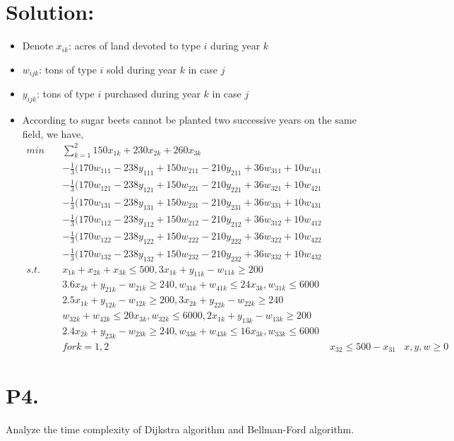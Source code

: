 \documentclass{article}
\theoremstyle{definition}
\theoremstyle{definition}
\theoremstyle{remark}
\begin{document}
\section*{Solution:}
\begin{itemize}
\item Denote $x_{ik}$: acres of land devoted to type $i$ during year $k$
\item $w_{ijk}$: tons of type $i$ sold during year $k$ in case $j$
\item $y_{ijk}$: tons of type $i$ purchased during year $k$ in case $j$
\item According to sugar beets cannot be planted two successive years on the same field, we have,
\begin{equation}
\begin{aligned}
min \quad &\sum_{k=1}^2 150x_{1k}+230x_{2k}+260x_{3k} \\                                                                      
& -\frac{1}{3}(170w_{111}-238y_{111}+150w_{211}-210y_{211}+36w_{311}+10w_{411} \\
& -\frac{1}{3}(170w_{121}-238y_{121}+150w_{221}-210y_{221}+36w_{321}+10w_{421} \\
& -\frac{1}{3}(170w_{131}-238y_{131}+150w_{231}-210y_{231}+36w_{331}+10w_{431} \\
& -\frac{1}{3}(170w_{112}-238y_{112}+150w_{212}-210y_{212}+36w_{312}+10w_{412} \\
& -\frac{1}{3}(170w_{122}-238y_{122}+150w_{222}-210y_{222}+36w_{322}+10w_{422} \\
& -\frac{1}{3}(170w_{132}-238y_{132}+150w_{232}-210y_{232}+36w_{332}+10w_{432} \\ 
s.t. \quad & x_{1k}+x_{2k}+x_{3k}\leq500,3x_{1k}+y_{11k}-w_{11k}\geq200 \\                                 
& 3.6x_{2k}+y_{21k}-w_{21k}\geq240,w_{31k}+w_{41k}\leq24x_{3k},w_{31k}\leq6000 \\
& 2.5x_{1k}+y_{12k}-w_{12k}\geq200,3x_{2k}+y_{22k}-w_{22k}\geq240 \\               
& w_{32k}+w_{42k}\leq20x_{3k},w_{32k}\leq6000,2x_{1k}+y_{13k}-w_{13k}\geq200 \\
& 2.4x_{2k}+y_{23k}-w_{23k}\geq240,w_{33k}+w_{43k}\leq16x_{3k},w_{33k}\leq6000 \\
& for k=1,2
& x_{32}\leq500-x_{31}
& x,y,w\geq0
\end{aligned}
\end{equation}
\end{itemize}


\section*{P4.}
Analyze the time complexity of Dijkstra algorithm and Bellman-Ford algorithm.
\end{document}
